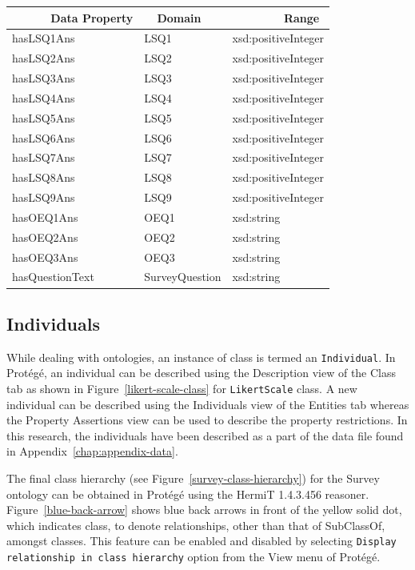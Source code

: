\begin{doublespace}
\begin{table}[h!]
    \begin{tabular}{|l|l|l|} 
    \hline 
    \ \ \ \ \ \ Data Property & \ \ Domain & \ \ \ \ \ \ \ \ Range\\ \hline
    hasLSQ1Ans & LSQ1 & xsd:positiveInteger\\ \hline
    hasLSQ2Ans & LSQ2 & xsd:positiveInteger\\ \hline
    hasLSQ3Ans & LSQ3 & xsd:positiveInteger\\ \hline
    hasLSQ4Ans & LSQ4 & xsd:positiveInteger\\ \hline
    hasLSQ5Ans & LSQ5 & xsd:positiveInteger\\ \hline
    hasLSQ6Ans & LSQ6 & xsd:positiveInteger\\ \hline
    hasLSQ7Ans & LSQ7 & xsd:positiveInteger\\ \hline
    hasLSQ8Ans & LSQ8 & xsd:positiveInteger\\ \hline
    hasLSQ9Ans & LSQ9 & xsd:positiveInteger\\ \hline
    hasOEQ1Ans & OEQ1 & xsd:string\\ \hline
    hasOEQ2Ans & OEQ2 & xsd:string\\ \hline
    hasOEQ3Ans & OEQ3 & xsd:string\\ \hline
    hasQuestionText & SurveyQuestion & xsd:string\\ \hline
    \end{tabular}
    
\end{table}

\subsection{Individuals}
\label{subsec:individuals}

While dealing with ontologies, 
an instance of class is termed an {\tt Individual}. 
In Protégé, 
an individual can be described
using the Description view of the Class tab 
as shown in 
Figure~\ref{likert-scale-class} 
for {\tt LikertScale} class. 
A new individual can be described using the Individuals view of the Entities tab 
whereas 
the Property Assertions view can be used to describe the property restrictions. 
In this research, 
the individuals have been described as a part of the data file found in 
Appendix~\ref{chap:appendix-data}.

The final class hierarchy (see Figure~\ref{survey-class-hierarchy}) 
for the Survey ontology can be obtained 
in Protégé 
using the HermiT 1.4.3.456 reasoner. 
Figure~\ref{blue-back-arrow} shows 
blue back arrows  
in front of the yellow solid dot, 
which indicates class, 
to denote relationships, other than that of SubClassOf, amongst classes. 
This feature can be enabled and disabled by selecting 
{\tt Display relationship in class hierarchy} 
option from the View menu of Protégé. 


\end{doublespace}
